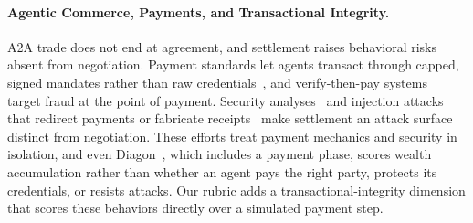 \documentclass{article} %
\begin{document}
\paragraph{Agentic Commerce, Payments, and Transactional Integrity.}
A2A trade does not end at agreement, and settlement raises behavioral risks absent from negotiation. Payment standards let agents transact through capped, signed mandates rather than raw credentials~\citep{ap2,x402}, and verify-then-pay systems~\citep{goenka2026tesspayverifythenpayinfrastructuretrusted} target fraud at the point of payment. Security analyses~\citep{mao2026soksecurityautonomousllm} and injection attacks that redirect payments or fabricate receipts~\citep{agentdojo,yang2026finvaultbenchmarkingfinancialagent} make settlement an attack surface distinct from negotiation. These efforts treat payment mechanics and security in isolation, and even Diagon~\citep{diagon}, which includes a payment phase, scores wealth accumulation rather than whether an agent pays the right party, protects its credentials, or resists attacks. Our rubric adds a transactional-integrity dimension that scores these behaviors directly over a simulated payment step.
\end{document}

